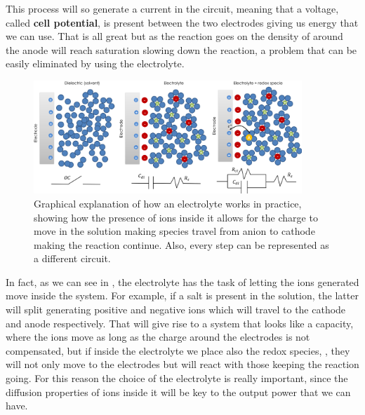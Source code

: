 This process will so generate a current in the circuit, meaning that a voltage, called \textbf{cell potential}, is present between the two electrodes giving us energy that we can use. That is all great but as the reaction goes on the density of  around the anode will reach saturation slowing down the reaction, a problem that can be easily eliminated by using the electrolyte. 
\begin{figure}
    \centering
    \includegraphics[width=0.9\textwidth]{Immagini/ElettrolitaEs.png}
    \caption{
        Graphical explanation of how an electrolyte works in practice, showing how the presence of ions inside it allows for the charge to move in the solution making species travel from anion to cathode making the reaction continue. Also, every step can be represented as a different circuit.
    }
    \label{fig:ElettrolitaEs}
\end{figure}
In fact, as we can see in , the electrolyte has the task of letting the ions generated move inside the system. For example, if a salt is present in the solution, the latter will split generating positive and negative ions which will travel to the cathode and anode respectively. That will give rise to a system that looks like a capacity, where the ions move as long as the charge around the electrodes is not compensated, but if inside the electrolyte we place also the redox species, , they will not only move to the electrodes but will react with those keeping the reaction going. For this reason the choice of the electrolyte is really important, since the diffusion properties of ions inside it will be key to the output power that we can have.

